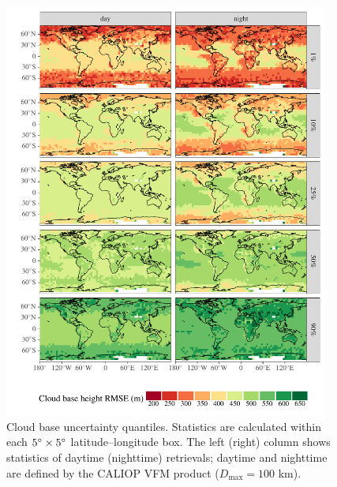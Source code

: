 \documentclass[essd,manuscript]{copernicus}\usepackage[]{graphicx}\usepackage[]{color}
\newenvironment{knitrout}{}{} %
\begin{document}
\begin{figure}
  \centering
\begin{knitrout}
\color{fgcolor}

{\centering \includegraphics[width=0.95\textwidth]{figure/method-cbase-uncert-quantiles-100-1} 

}



\end{knitrout}
  \caption{Cloud base uncertainty quantiles.  Statistics are calculated within
    each $5^{\circ}\times 5^{\circ}$ latitude--longitude box.  The left (right)
    column shows statistics of daytime (nighttime) retrievals; daytime and
    nighttime are defined by the CALIOP VFM product ($D_\text{max} = 100$ km).}
  \label{fig:uncert-quantiles}
\end{figure}

\end{document}
